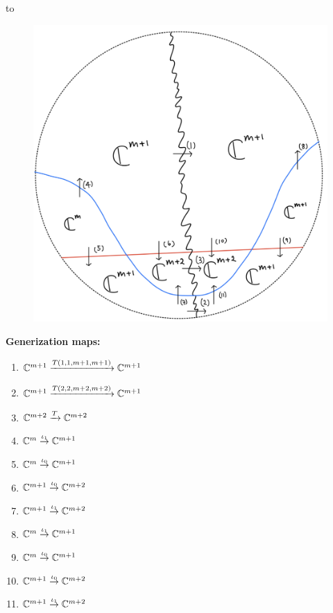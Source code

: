 to
\begin{figure}[H]
    \centering
    \includegraphics[scale = 0.95]{diagrams/lemma1/33.png} 
    \caption{}
    \label{fig:your-label}
\end{figure}
\textbf{Generization maps:}
\begin{enumerate}[label = (\arabic*)]
\item $\mathbb{C}^{m+1} \xrightarrow{T(1,1,m+1,m+1)} \mathbb{C}^{m+1}$

\item $\mathbb{C}^{m+1} \xrightarrow{T(2,2,m+2,m+2)} \mathbb{C}^{m+1}$

\item $\mathbb{C}^{m+2} \xrightarrow{T} \mathbb{C}^{m+2}$

\item $\mathbb{C}^{m} \overset{\iota_1}{\rightarrow} \mathbb{C}^{m+1}$

\item $\mathbb{C}^{m} \overset{\iota_0}{\rightarrow} \mathbb{C}^{m+1}$

\item $\mathbb{C}^{m+1} \overset{\iota_0}{\rightarrow} \mathbb{C}^{m+2}$

\item $\mathbb{C}^{m+1} \overset{\iota_1}{\rightarrow} \mathbb{C}^{m+2}$

\item $\mathbb{C}^{m} \overset{\iota_1}{\rightarrow} \mathbb{C}^{m+1}$

\item $\mathbb{C}^{m} \overset{\iota_0}{\rightarrow} \mathbb{C}^{m+1}$

\item $\mathbb{C}^{m+1} \overset{\iota_0}{\rightarrow} \mathbb{C}^{m+2}$

\item $\mathbb{C}^{m+1} \overset{\iota_1}{\rightarrow} \mathbb{C}^{m+2}$
\end{enumerate}
